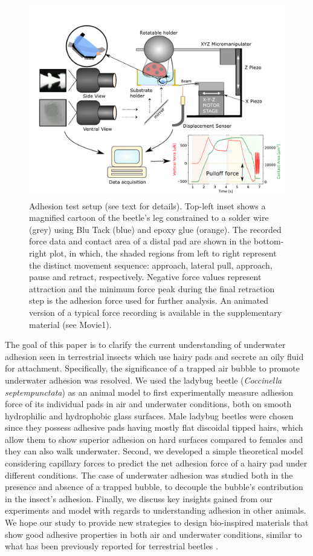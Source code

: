 \documentclass[vruler,JEB]{COB}%
\begin{document}
\begin{figure}[!t]
\centering
\includegraphics[width=6in]{Figure1-Setup_schematic}%
\caption[]{Adhesion test setup (see text for details). Top-left inset shows a magnified cartoon of the beetle's leg constrained to a solder wire (grey) using Blu Tack (blue) and epoxy glue (orange). The recorded force data and
contact area of a distal pad are shown in the bottom-right plot, in which, the shaded
regions from left to right represent the distinct movement sequence: approach, lateral pull, approach, pause and retract, respectively. Negative force values
represent attraction and the minimum force peak during the final retraction
step is the adhesion force used for further analysis. An animated version of a typical force recording is available in the supplementary material (see Movie1).}
\label{fig:Setup}
\end{figure}

The goal of this paper is to clarify the current understanding of underwater adhesion seen in terrestrial insects which use hairy pads and secrete an oily fluid for attachment. Specifically, the significance of a trapped air bubble to promote underwater adhesion was resolved. We used the ladybug beetle (\emph{Coccinella septempunctata}) as an animal model to first experimentally measure adhesion force of its individual pads in air and underwater conditions, both on smooth hydrophilic and hydrophobic glass surfaces. Male ladybug beetles were chosen since they possess adhesive pads having mostly flat discoidal tipped hairs, which allow them to show superior adhesion on hard surfaces compared to females \citep{RN145} and they can also walk underwater. Second, we developed a simple theoretical model considering capillary forces to predict the net adhesion force of a hairy pad under different conditions. The case of underwater adhesion was studied both in the presence and absence of a trapped bubble, to decouple the bubble's contribution in the insect's adhesion. Finally, we discuss key insights gained from our experiments and model with regards to understanding adhesion in other animals. We hope our study to provide new strategies to design bio-inspired materials that show good adhesive properties in both air and underwater conditions, similar to what has been previously reported for terrestrial beetles \citep{RN87}.
\end{document}
